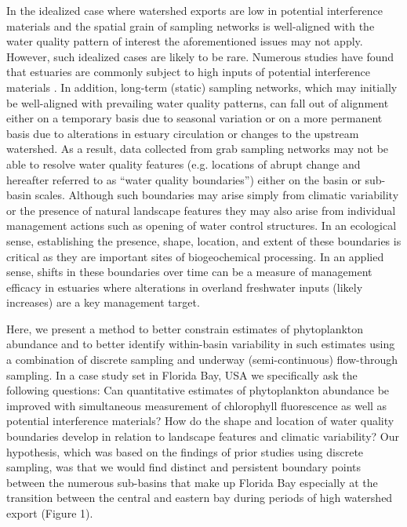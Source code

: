\documentclass[review]{elsarticle}
\begin{document}
In the idealized case where watershed exports are low in potential interference materials and the spatial grain of sampling networks is well-aligned with the water quality pattern of interest the aforementioned issues may not apply. However, such idealized cases are likely to be rare. Numerous studies have found that estuaries are commonly subject to high inputs of potential interference materials \citep[e.g. color dissolved organic matter;][]{du2010characteristics}. In addition, long-term (static) sampling networks, which may initially be well-aligned with prevailing water quality patterns, can fall out of alignment either on a temporary basis due to seasonal variation or on a more permanent basis due to alterations in estuary circulation or changes to the upstream watershed. As a result, data collected from grab sampling networks may not be able to resolve water quality features (e.g. locations of abrupt change and hereafter referred to as “water quality boundaries”) either on the basin or sub-basin scales. Although such boundaries may arise simply from climatic variability or the presence of natural landscape features they may also arise from individual management actions such as opening of water control structures. In an ecological sense, establishing the presence, shape, location, and extent of these boundaries is critical as they are important sites of biogeochemical processing. In an applied sense, shifts in these boundaries over time can be a measure of management efficacy in estuaries where alterations in overland freshwater inputs (likely increases) are a key management target.

Here, we present a method to better constrain estimates of phytoplankton abundance and to better identify within-basin variability in such estimates using a combination of discrete sampling and underway (semi-continuous) flow-through sampling. In a case study set in Florida Bay, USA we specifically ask the following questions: Can quantitative estimates of phytoplankton abundance be improved with simultaneous measurement of chlorophyll fluorescence as well as potential interference materials? How do the shape and location of water quality boundaries develop in relation to landscape features and climatic variability? Our hypothesis, which was based on the findings of prior studies using discrete sampling, was that we would find distinct and persistent boundary points between the numerous sub-basins that make up Florida Bay especially at the transition between the central and eastern bay during periods of high watershed export (Figure 1).
  
\end{document}
